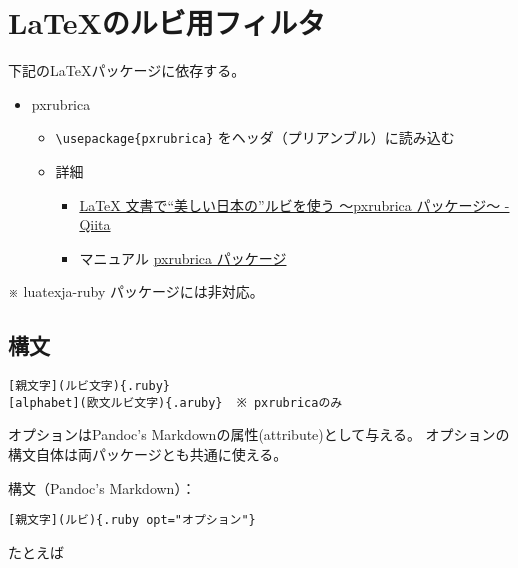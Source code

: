 \documentclass[
  a4paper,
  lualatex,
  ja=standard]{bxjsarticle}
\author{}
\date{}
\providecommand{\tightlist}{%
  \setlength{\itemsep}{0pt}\setlength{\parskip}{0pt}}
\begin{document}
\hypertarget{latexux306eux30ebux30d3ux7528ux30d5ux30a3ux30ebux30bf}{%
\section{LaTeXのルビ用フィルタ}\label{latexux306eux30ebux30d3ux7528ux30d5ux30a3ux30ebux30bf}}

下記のLaTeXパッケージに依存する。

\begin{itemize}
\tightlist
\item
  pxrubrica

  \begin{itemize}
  \tightlist
  \item
    \texttt{\textbackslash{}usepackage\{pxrubrica\}}
    をヘッダ（プリアンブル）に読み込む
  \item
    詳細

    \begin{itemize}
    \tightlist
    \item
      \href{https://qiita.com/zr_tex8r/items/42466cbcbeb670a3a2dc}{LaTeX
      文書で``美しい日本の''ルビを使う ～pxrubrica パッケージ～ - Qiita}
    \item
      マニュアル
      \href{http://texdoc.net/texmf-dist/doc/platex/pxrubrica/pxrubrica.pdf}{pxrubrica
      パッケージ}
    \end{itemize}
  \end{itemize}
\end{itemize}

※ luatexja-ruby パッケージには非対応。

\hypertarget{ux69cbux6587}{%
\subsection{構文}\label{ux69cbux6587}}

\begin{verbatim}
[親文字](ルビ文字){.ruby}
[alphabet](欧文ルビ文字){.aruby}  ※ pxrubricaのみ
\end{verbatim}

オプションはPandoc's Markdownの属性(attribute)として与える。
オプションの構文自体は両パッケージとも共通に使える。

構文（Pandoc's Markdown）：

\begin{verbatim}
[親文字](ルビ){.ruby opt="オプション"}
\end{verbatim}

たとえば
\end{document}
